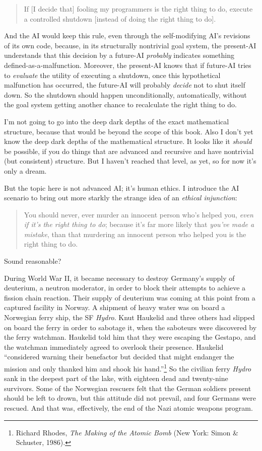 \begin{quote}
{
 If [I decide that] fooling my programmers is the right thing to
do, execute a controlled shutdown [instead of doing the right thing to
  do].}
\end{quote}


 And the AI would keep this rule, even through the self-modifying
AI's revisions of its own code, because, in its
structurally nontrivial goal system, the present-AI understands that
this decision by a future-AI \textit{probably} indicates something
defined-as-a-malfunction. Moreover, the present-AI knows that if
future-AI tries to \textit{evaluate} the utility of executing a
shutdown, once this hypothetical malfunction has occurred, the
future-AI will probably \textit{decide} not to shut itself down. So the
shutdown should happen unconditionally, automatically, without the goal
system getting another chance to recalculate the right thing to do.


 I'm not going to go into the deep dark depths of
the exact mathematical structure, because that would be beyond the
scope of this book. Also I don't yet know the deep dark
depths of the mathematical structure. It looks like it \textit{should}
be possible, if you do things that are advanced and recursive and have
nontrivial (but consistent) structure. But I haven't
reached that level, as yet, so for now it's only a
dream.


 But the topic here is not advanced AI; it's human
ethics. I introduce the AI scenario to bring out more starkly the
strange idea of an \textit{ethical injunction}:

\begin{quote}
{
 You should never, ever murder an innocent person
who's helped you, \textit{even if it's
the right thing to do}; because it's far more likely
that \textit{you've made a mistake}, than that
murdering an innocent person who helped you is the right thing to do.}
\end{quote}


 Sound reasonable?


 During World War II, it became necessary to destroy
Germany's supply of deuterium, a neutron moderator, in
order to block their attempts to achieve a fission chain reaction.
Their supply of deuterium was coming at this point from a captured
facility in Norway. A shipment of heavy water was on board a Norwegian
ferry ship, the SF \textit{Hydro}. Knut Haukelid and three others had
slipped on board the ferry in order to sabotage it, when the saboteurs
were discovered by the ferry watchman. Haukelid told him that they were
escaping the Gestapo, and the watchman immediately agreed to overlook
their presence. Haukelid ``considered warning their
benefactor but decided that might endanger the mission and only thanked
him and shook his hand.''\footnote{Richard Rhodes, \textit{The Making of the Atomic Bomb} (New
York: Simon \& Schuster, 1986).} So the
civilian ferry \textit{Hydro} sank in the deepest part of the lake,
with eighteen dead and twenty-nine survivors. Some of the Norwegian
rescuers felt that the German soldiers present should be left to drown,
but this attitude did not prevail, and four Germans were rescued. And
that was, effectively, the end of the Nazi atomic weapons program.


